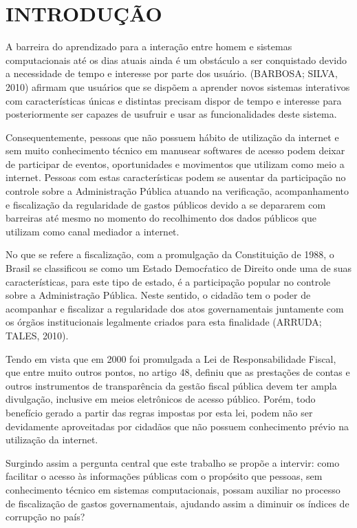 \section{INTRODUÇÃO}
\singlespacing
A barreira do aprendizado para a interação entre homem e sistemas computacionais até os dias atuais ainda é um obstáculo a ser conquistado devido a necessidade de tempo e interesse por parte dos usuário. (BARBOSA; SILVA, 2010) afirmam que usuários que se dispõem a aprender novos sistemas interativos com características únicas e distintas precisam dispor de tempo e interesse para posteriormente ser capazes de usufruir e usar as funcionalidades deste sistema.

Consequentemente, pessoas que não possuem hábito de utilização da internet e sem muito conhecimento técnico em manusear softwares de acesso podem deixar de participar de eventos, oportunidades e movimentos que utilizam como meio a internet. Pessoas com estas características podem se ausentar da participação no controle sobre a Administração Pública atuando na verificação, acompanhamento e fiscalização da regularidade de gastos públicos devido a se depararem com barreiras até mesmo no momento do recolhimento dos dados públicos que utilizam como canal mediador a internet.

No que se refere a fiscalização, com a promulgação da Constituição de 1988, o Brasil se classificou se como um Estado Democŕatico de Direito onde uma de suas características, para este tipo de estado, é a participação popular no controle sobre a Administração Pública. Neste sentido, o cidadão tem o poder de acompanhar e fiscalizar a regularidade dos atos governamentais juntamente com os órgãos institucionais legalmente criados para esta finalidade (ARRUDA; TALES, 2010).

Tendo em vista que em 2000 foi promulgada a Lei de Responsabilidade Fiscal, que entre muito outros pontos, no artigo 48, definiu que as prestações de contas e outros instrumentos de transparência da gestão fiscal pública devem ter ampla divulgação, inclusive em meios eletrônicos de acesso público. Porém, todo benefício gerado a partir das regras impostas por esta lei, podem não ser devidamente aproveitadas por cidadãos que não possuem conhecimento prévio na utilização da internet.

Surgindo assim a pergunta central que este trabalho se propõe a intervir: como facilitar o acesso às informações públicas com o propósito que pessoas, sem conhecimento técnico em sistemas computacionais, possam auxiliar no processo de fiscalização de gastos governamentais, ajudando assim a diminuir os índices de corrupção no país?

